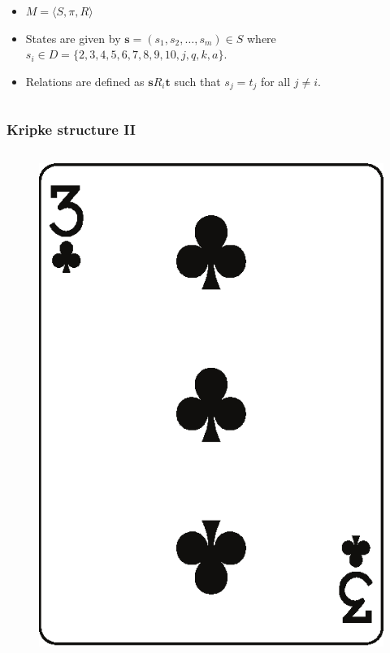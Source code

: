 \documentclass[10pt]{beamer}
\begin{document}
\begin{frame}
\begin{columns}
  \begin{column}{7cm}
    \begin{itemize}[label=$\clubsuit$]
    \item $M = \langle S, \pi, R \rangle$
    \item States are given by $\boldsymbol s = (s_1,s_2,\ldots,s_m) \in S$ where $s_i \in D = \{2,3,4,5,6,7,8,9,10,j,q,k,a\}$.
    \item Relations are defined as $\boldsymbol s R_i \boldsymbol t$ such that $s_j = t_j$ for all $j\neq i$.
    \end{itemize}
  \end{column}
 \end{columns}
\end{frame}

\begin{frame}
\frametitle{Kripke structure II}
 \begin{columns}
  \begin{column}{3cm}
   \begin{figure}
    \includegraphics[width=\linewidth]{im/clubs_3.eps}
   \end{figure}
  \end{column}
  

\end{columns}
\end{frame}
\end{document}
